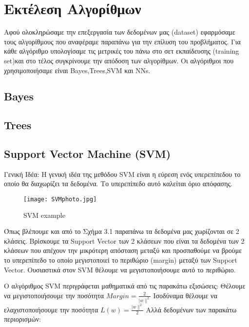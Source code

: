
\chapter{Εκτέλεση Αλγορίθμων}

Αφού ολοκληρώσαμε την επεξεργασία των δεδομένων μας (dataset) εφαρμόσαμε τους αλγορίθμους που αναφέραμε παραπάνω για την επίλυση του προβλήματος. Για κάθε αλγόριθμο υπολογίσαμε τις μετρικές του πάνω στο σετ εκπαίδευσης (training set)και στο τέλος συγκρίνουμε την απόδοση των αλγορίθμων. Οι αλγόριθμοι που χρησιμοποιήσαμε είναι Bayes,Trees,SVM και NNs.

\section{Bayes}

\section{Trees}

\section{Support Vector Machine (SVM)}

Γενική Ιδέα:   	H γενική ιδέα της μεθόδου SVM είναι η εύρεση ενός υπερεπίπεδου το οποίο θα διαχωρίζει τα δεδομένα. Το υπερεπίπεδο αυτό καλείται όριο απόφασης. 

\begin{figure}[h!]
	\texttt{[image: SVMphoto.jpg]}
	\caption {SVM example}
	\label{fig:smith4}  
\end{figure}

Όπως βλέπουμε και από το Σχήμα 3.1 παραπάνω τα δεδομένα μας χωρίζονται σε 2 κλάσεις. Βρίσκουμε τα Support Vector των 2 κλάσεων που είναι τα δεδομένα των 2 κλάσεων που απέχουν την μικρότερη απόσταση μεταξύ και προσπαθούμε να βρούμε το υπερεπίπεδο το οποίο μεγιστοποιεί το περιθώριο (margin) μεταξύ των Support Vector. Ουσιαστικά στον SVM θέλουμε να μεγιστοποιήσουμε αυτό το περιθώριο.


Ο αλγόριθμος SVM περιγράφεται μαθηματικά από τις παρακάτω εξισώσεις:
\newline
Θέλουμε να μεγιστοποιήσουμε την ποσότητα   $ Margin=\frac{2}{|w\|^2} $
\newline
Ισοδύναμα θέλουμε να ελαχιστοποιήσουμε την ποσότητα  $ L(w)=\frac{|w\|^2}{2} $
\newline
	Αλλά δεδομένων των παρακάτω περιορισμών:


